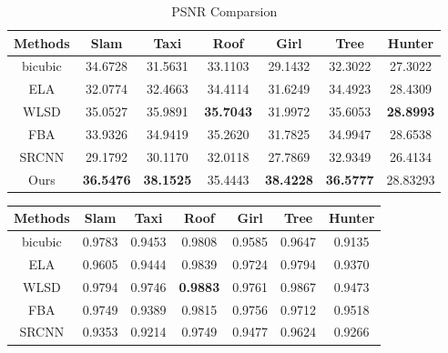 \documentclass[acmtog]{acmart}
\begin{document}
\begin{table*}
\center
\begin{tabular}{|c|c|c|c|c|c|c|}
  \hline
  Methods & Slam         & Taxi & Roof & Girl      & Tree  & Hunter   \\\hline
  bicubic & 34.6728          & 31.5631             &33.1103             &29.1432    		 & 32.3022              & 27.3022  \\  \hline
  ELA     & 32.0774          & 32.4663             &34.4114             &31.6249             & 34.4923               & 28.4309  \\ \hline
  WLSD    & 35.0527          & 35.9891             &\textbf{35.7043}    &31.9972             & 35.6053               & \textbf{28.8993} \\ \hline
  FBA     & 33.9326          & 34.9419             &35.2620             &31.7825             & 34.9947               & 28.6538  \\ \hline
  SRCNN   & 29.1792          & 30.1170             &32.0118             &27.7869             & 32.9349               & 26.4134  \\ \hline
  Ours    & \textbf{36.5476} & \textbf{38.1525}    &35.4443             &\textbf{38.4228}    &\textbf{36.5777}       & 28.83293 \\ \hline
\end{tabular}
\caption{PSNR Comparsion}
\label{tab:psnr_comparsion}
\end{table*}\begin{table*}
	\center
	\begin{tabular}{|c|c|c|c|c|c|c|}
		\hline
		Methods & Slam        & Taxi       & Roof       			& Girl             & Tree             & Hunter  \\\hline
		bicubic & 0.9783          & 0.9453           & 0.9808     			&0.9585            &0.9647            & 0.9135   \\  \hline
		ELA     & 0.9605          & 0.9444           & 0.9839     			&0.9724            &0.9794            & 0.9370   \\ \hline
		WLSD    & 0.9794          & 0.9746           & \textbf{0.9883}      &0.9761            &0.9867            & 0.9473  \\ \hline
		FBA     & 0.9749          & 0.9389           & 0.9815     			&0.9756        	   &0.9712            & 0.9518   \\ \hline
		SRCNN   & 0.9353          & 0.9214           & 0.9749     			&0.9477            &0.9624            & 0.9266 \\ \hline

\end{tabular}
\end{table*}
\end{document}
